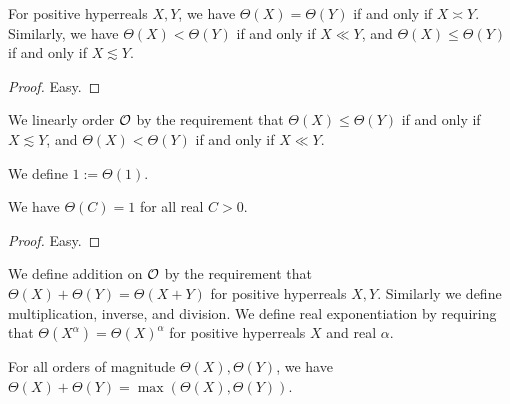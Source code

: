 \begin{lemma}\label{theta-kernel}\leanok For positive hyperreals $X,Y$, we have $\Theta(X) = \Theta(Y)$ if and only if $X \asymp Y$.  Similarly, we have $\Theta(X) < \Theta(Y)$ if and only if $X \ll Y$, and $\Theta(X) \leq \Theta(Y)$ if and only if $X \lesssim Y$.
\end{lemma}

\begin{proof}\leanok Easy.
\end{proof}

\begin{definition}\label{ord-mag-def}\leanok  We linearly order ${\mathcal O}$ by the requirement that $\Theta(X) \leq \Theta(Y)$ if and only if $X \lesssim Y$, and  $\Theta(X) < \Theta(Y)$ if and only if $X \ll Y$.
\end{definition}

\begin{definition}[One]\label{one-def}\leanok We define $1 := \Theta(1)$.
\end{definition}

\begin{lemma}\label{const-triv}\leanok We have $\Theta(C) = 1$ for all real $C>0$.
\end{lemma}

\begin{proof}\leanok Easy.
\end{proof}

\begin{definition}\label{mag-arith}\leanok  We define addition on ${\mathcal O}$ by the requirement that $\Theta(X) + \Theta(Y) = \Theta(X+Y)$ for positive hyperreals $X,Y$.  Similarly we define multiplication, inverse, and division.  We define real exponentiation by requiring that $\Theta(X^\alpha) = \Theta(X)^\alpha$ for positive hyperreals $X$ and real $\alpha$.
\end{definition}

\begin{lemma}\label{tropical-add}\leanok For all orders of magnitude $\Theta(X), \Theta(Y)$, we have $\Theta(X) + \Theta(Y) = \max(\Theta(X), \Theta(Y))$.
\end{lemma}

